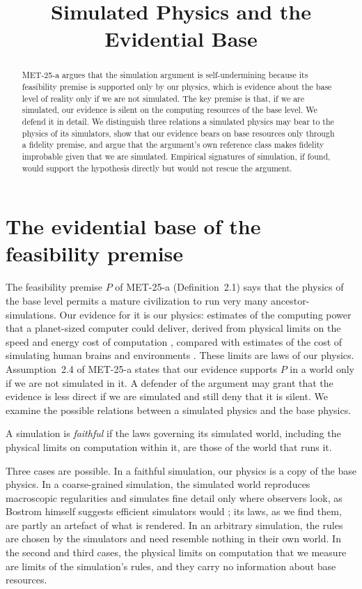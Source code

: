\documentclass{situationist-preprint}
\title{Simulated Physics and the Evidential Base}
\begin{document}
\maketitle

\begin{abstract}
MET-25-a argues that the simulation argument is self-undermining because its feasibility premise is supported only by our physics, which is evidence about the base level of reality only if we are not simulated. The key premise is that, if we are simulated, our evidence is silent on the computing resources of the base level. We defend it in detail. We distinguish three relations a simulated physics may bear to the physics of its simulators, show that our evidence bears on base resources only through a fidelity premise, and argue that the argument's own reference class makes fidelity improbable given that we are simulated. Empirical signatures of simulation, if found, would support the hypothesis directly but would not rescue the argument.
\end{abstract}

\section{The evidential base of the feasibility premise}

The feasibility premise $P$ of MET-25-a (Definition~2.1) says that the physics of the base level permits a mature civilization to run very many ancestor-simulations. Our evidence for it is our physics: estimates of the computing power that a planet-sized computer could deliver, derived from physical limits on the speed and energy cost of computation \citep{Lloyd2000}, compared with estimates of the cost of simulating human brains and environments \citep{Bostrom2003}. These limits are laws of our physics. Assumption~2.4 of MET-25-a states that our evidence supports $P$ in a world only if we are not simulated in it. A defender of the argument may grant that the evidence is less direct if we are simulated and still deny that it is silent. We examine the possible relations between a simulated physics and the base physics.

\begin{definition}[Fidelity]\label{d:fid}
A simulation is \emph{faithful} if the laws governing its simulated world, including the physical limits on computation within it, are those of the world that runs it.
\end{definition}

Three cases are possible. In a faithful simulation, our physics is a copy of the base physics. In a coarse-grained simulation, the simulated world reproduces macroscopic regularities and simulates fine detail only where observers look, as Bostrom himself suggests efficient simulators would \citep{Bostrom2003}; its laws, as we find them, are partly an artefact of what is rendered. In an arbitrary simulation, the rules are chosen by the simulators and need resemble nothing in their own world. In the second and third cases, the physical limits on computation that we measure are limits of the simulation's rules, and they carry no information about base resources.
\end{document}
